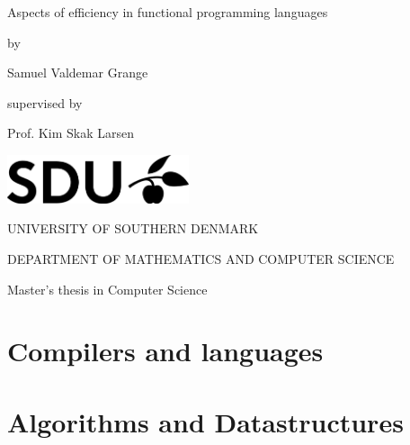 \documentclass[11pt,oneside,a4paper]{report}
\theoremstyle{plain}
\theoremstyle{case}
\theoremstyle{definition}
\begin{document}
\begin{titlepage}
	\begin{center}
		\vspace*{1cm}
		\huge{Aspects of efficiency in functional programming languages}

		\vspace*{0.5cm}
		\large{by}

		\vspace{0.5cm}
		\Large{Samuel Valdemar Grange}

		\vspace*{0.5cm}
		\normalsize{supervised by}

		\vspace{0.5cm}
		\large{Prof. Kim Skak Larsen}

		\vfill

		\vspace*{0.7cm}
		\includegraphics[width=0.4\textwidth]{sdulogo}

		\vspace*{1cm}
		\MakeUppercase{University of southern Denmark}

		\vspace*{0.3cm}
		\MakeUppercase{Department of mathematics and computer science}

		\vspace*{0.3cm}
		\large{Master's thesis in Computer Science}
	\end{center}

\end{titlepage}

\tableofcontents

\clearpage



\part{Compilers and languages}







\part{Algorithms and Datastructures}



%
\printbibliography


\end{document}
